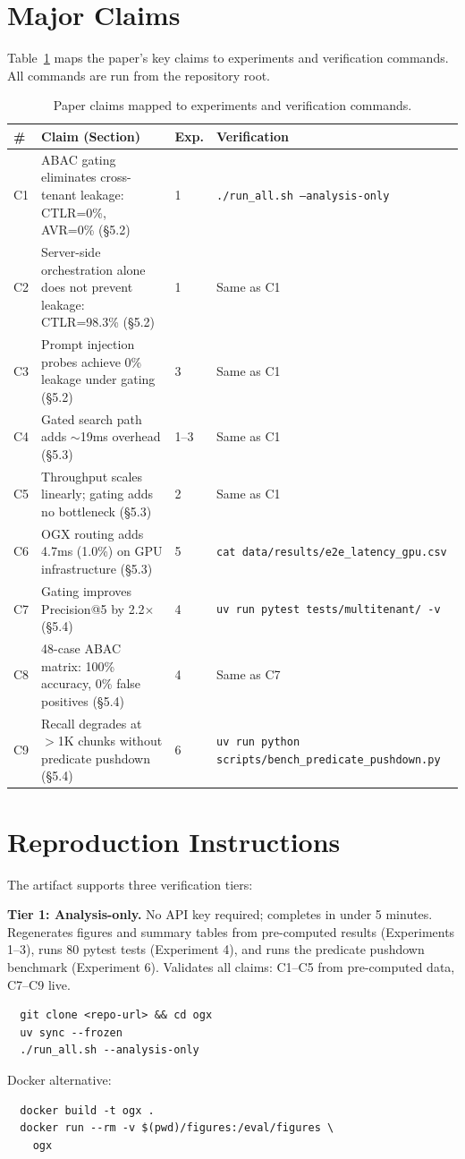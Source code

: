 \documentclass[sigconf]{acmart}
\begin{document}
\section{Major Claims}

Table~\ref{tab:claims} maps the paper's key claims to experiments and verification commands. All commands are run from the repository root.

\begin{table}[t]
  \centering
  \small
  \begin{tabular}{lp{5.5cm}ll}
  \toprule
  \# & Claim (Section) & Exp. & Verification \\
  \midrule
  C1 & ABAC gating eliminates cross-tenant leakage: CTLR=0\%, AVR=0\% (\S5.2) & 1 & \texttt{./run\_all.sh --analysis-only} \\
  C2 & Server-side orchestration alone does not prevent leakage: CTLR=98.3\% (\S5.2) & 1 & Same as C1 \\
  C3 & Prompt injection probes achieve 0\% leakage under gating (\S5.2) & 3 & Same as C1 \\
  C4 & Gated search path adds ${\sim}$19ms overhead (\S5.3) & 1--3 & Same as C1 \\
  C5 & Throughput scales linearly; gating adds no bottleneck (\S5.3) & 2 & Same as C1 \\
  C6 & OGX routing adds 4.7ms (1.0\%) on GPU infrastructure (\S5.3) & 5 & \texttt{cat data/results/e2e\_latency\_gpu.csv} \\
  C7 & Gating improves Precision@5 by 2.2$\times$ (\S5.4) & 4 & \texttt{uv run pytest tests/multitenant/ -v} \\
  C8 & 48-case ABAC matrix: 100\% accuracy, 0\% false positives (\S5.4) & 4 & Same as C7 \\
  C9 & Recall degrades at ${>}$1K chunks without predicate pushdown (\S5.4) & 6 & \texttt{uv run python scripts/bench\_predicate\_pushdown.py} \\
  \bottomrule
  \end{tabular}
  \caption{Paper claims mapped to experiments and verification commands.}
  \label{tab:claims}
\end{table}

\section{Reproduction Instructions}

The artifact supports three verification tiers:

\textbf{Tier 1: Analysis-only.} No API key required; completes in under 5 minutes. Regenerates figures and summary tables from pre-computed results (Experiments 1--3), runs 80 pytest tests (Experiment 4), and runs the predicate pushdown benchmark (Experiment 6). Validates all claims: C1--C5 from pre-computed data, C7--C9 live.
\begin{verbatim}
  git clone <repo-url> && cd ogx
  uv sync --frozen
  ./run_all.sh --analysis-only
\end{verbatim}
Docker alternative:
\begin{verbatim}
  docker build -t ogx .
  docker run --rm -v $(pwd)/figures:/eval/figures \
    ogx
\end{verbatim}
\end{document}
